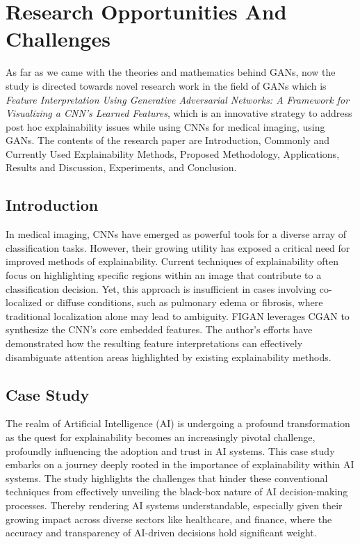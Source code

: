\chapter{Research Opportunities And Challenges}

\noindent
As far as we came with the theories and mathematics behind GANs, now the study is directed towards novel research work in the field of GANs which is \textit{Feature Interpretation Using Generative Adversarial Networks: A Framework for Visualizing a CNN’s Learned Features}, which is an innovative strategy to address post hoc explainability issues while using CNNs for medical imaging, using GANs. The contents of the research paper are Introduction, Commonly and Currently Used Explainability Methods, Proposed Methodology, Applications, Results and Discussion, Experiments, and Conclusion.

\section{Introduction}

\noindent
In medical imaging, CNNs have emerged as powerful tools for a diverse array of classification tasks. However, their growing utility has exposed a critical need for improved methods of explainability. Current techniques of explainability often focus on highlighting specific regions within an image that contribute to a classification decision. Yet, this approach is insufficient in cases involving co-localized or diffuse conditions, such as pulmonary edema or fibrosis, where traditional localization alone may lead to ambiguity. FIGAN leverages CGAN to synthesize the CNN's core embedded features. The author's efforts have demonstrated how the resulting feature interpretations can effectively disambiguate attention areas highlighted by existing explainability methods.

\clearpage

\section{Case Study}

\noindent
The realm of Artificial Intelligence (AI) is undergoing a profound transformation as the quest for explainability becomes an increasingly pivotal challenge, profoundly influencing the adoption and trust in AI systems. This case study embarks on a journey deeply rooted in the importance of explainability within AI systems. The study highlights the challenges that hinder these conventional techniques from effectively unveiling the black-box nature of AI decision-making processes. Thereby rendering AI systems understandable, especially given their growing impact across diverse sectors like healthcare, and finance, where the accuracy and transparency of AI-driven decisions hold significant weight.

